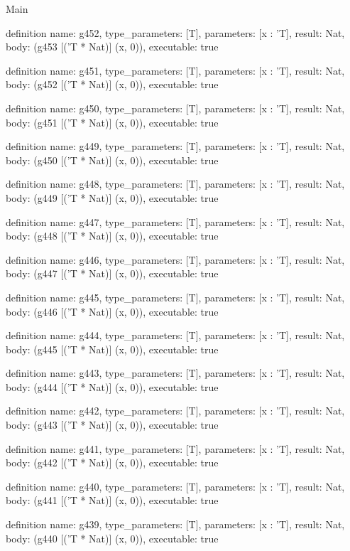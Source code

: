 \begin{lexlean}{Main}
\begin{semanticmodule}
definition{
  name: g452,
  type_parameters: [T],
  parameters: [x : 'T],
  result: Nat,
  body: (g453 [('T * Nat)] (x, 0)),
  executable: true
}

definition{
  name: g451,
  type_parameters: [T],
  parameters: [x : 'T],
  result: Nat,
  body: (g452 [('T * Nat)] (x, 0)),
  executable: true
}

definition{
  name: g450,
  type_parameters: [T],
  parameters: [x : 'T],
  result: Nat,
  body: (g451 [('T * Nat)] (x, 0)),
  executable: true
}

definition{
  name: g449,
  type_parameters: [T],
  parameters: [x : 'T],
  result: Nat,
  body: (g450 [('T * Nat)] (x, 0)),
  executable: true
}

definition{
  name: g448,
  type_parameters: [T],
  parameters: [x : 'T],
  result: Nat,
  body: (g449 [('T * Nat)] (x, 0)),
  executable: true
}

definition{
  name: g447,
  type_parameters: [T],
  parameters: [x : 'T],
  result: Nat,
  body: (g448 [('T * Nat)] (x, 0)),
  executable: true
}

definition{
  name: g446,
  type_parameters: [T],
  parameters: [x : 'T],
  result: Nat,
  body: (g447 [('T * Nat)] (x, 0)),
  executable: true
}

definition{
  name: g445,
  type_parameters: [T],
  parameters: [x : 'T],
  result: Nat,
  body: (g446 [('T * Nat)] (x, 0)),
  executable: true
}

definition{
  name: g444,
  type_parameters: [T],
  parameters: [x : 'T],
  result: Nat,
  body: (g445 [('T * Nat)] (x, 0)),
  executable: true
}

definition{
  name: g443,
  type_parameters: [T],
  parameters: [x : 'T],
  result: Nat,
  body: (g444 [('T * Nat)] (x, 0)),
  executable: true
}

definition{
  name: g442,
  type_parameters: [T],
  parameters: [x : 'T],
  result: Nat,
  body: (g443 [('T * Nat)] (x, 0)),
  executable: true
}

definition{
  name: g441,
  type_parameters: [T],
  parameters: [x : 'T],
  result: Nat,
  body: (g442 [('T * Nat)] (x, 0)),
  executable: true
}

definition{
  name: g440,
  type_parameters: [T],
  parameters: [x : 'T],
  result: Nat,
  body: (g441 [('T * Nat)] (x, 0)),
  executable: true
}

definition{
  name: g439,
  type_parameters: [T],
  parameters: [x : 'T],
  result: Nat,
  body: (g440 [('T * Nat)] (x, 0)),
  executable: true
}


\end{semanticmodule}
\end{lexlean}
